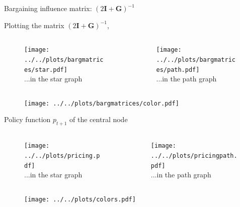 \documentclass{beamer}
\newcommand{\matr}[1]{\bm{#1}}
\newcommand{\I}{\matr{I}}
\newcommand{\G}{\matr{G}}
\begin{document}
\begin{frame} {Bargaining influence matrix: $(2\I + \G)^{-1}$ }

    Plotting the matrix $(2\I + \G)^{-1}$,

    \begin{columns}
        \begin{column}{.47\textwidth}
            \begin{figure}
                \texttt{[image: ../../plots/bargmatrices/star.pdf]}
                \\ ...in the star graph
            \end{figure}
        \end{column}
        \begin{column}{.47\textwidth}
            \begin{figure}
                \texttt{[image: ../../plots/bargmatrices/path.pdf]}
                \\ ...in the path graph
            \end{figure}
        \end{column}
    \end{columns}

    \hfill

    \begin{figure}
        \centering
        \texttt{[image: ../../plots/bargmatrices/color.pdf]}
    \end{figure}

\end{frame}

\begin{frame} {Policy function $p_{t+1}$ of the central node}
    \begin{columns}
        \begin{column}{.47\textwidth}
            \begin{figure}
                \texttt{[image: ../../plots/pricing.pdf]}
                \\ ...in the star graph
            \end{figure}
        \end{column}
        \begin{column}{.47\textwidth}
            \begin{figure}
                \texttt{[image: ../../plots/pricingpath.pdf]}
                \\ ...in the path graph
            \end{figure}
        \end{column}
    \end{columns}

    \hfill

    \begin{figure}
        \centering
        \texttt{[image: ../../plots/colors.pdf]}
    \end{figure}

\end{frame}
\end{document}
